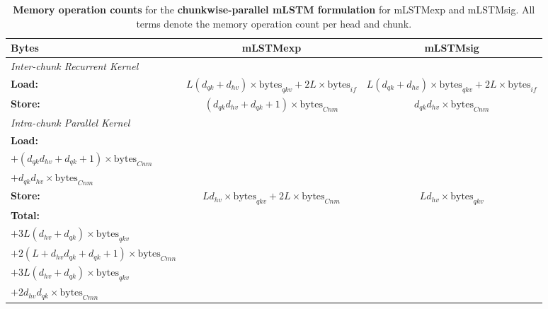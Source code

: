 \documentclass{article}
\begin{document}
    \begin{table}[htbp]
        \vspace{-0.3cm}
        \centering
        \caption{\label{tab:memop_counts_mlstm_chunkwise} \textbf{Memory operation counts} for the \textbf{chunkwise-parallel mLSTM formulation} for mLSTMexp and mLSTMsig.
            All terms denote the memory operation count per head and chunk.}
        \vspace{0.2cm}
        \begin{tabular}{lcc}
            \toprule
            Bytes           & mLSTMexp                                                                              & mLSTMsig                                                                      \\
            \midrule
            \multicolumn{3}{l}{\textit{Inter-chunk Recurrent Kernel}}                                                                                                                               \\
            \textbf{Load:}  & $L (d_{qk} + d_{hv}) \times \text{bytes}_{qkv} + 2L \times \text{bytes}_{if}$         & $L (d_{qk} + d_{hv}) \times \text{bytes}_{qkv} + 2L \times \text{bytes}_{if}$ \\
            \textbf{Store:} & $(d_{qk} d_{hv} + d_{qk} + 1) \times \text{bytes}_{Cnm}$                              & $d_{qk} d_{hv} \times \text{bytes}_{Cnm}$                                     \\
            \midrule
            \multicolumn{3}{l}{\textit{Intra-chunk Parallel Kernel}}                                                                                                                                \\
            \textbf{Load:}  & \thead{$L (2d_{qk} + d_{hv}) \times \text{bytes}_{qkv} + 2L \times \text{bytes}_{if}$                                                                                 \\ $ + (d_{qk} d_{hv} + d_{qk} + 1) \times \text{bytes}_{Cnm}$} & \thead{$L (2d_{qk} + d_{hv}) \times \text{bytes}_{qkv} + 2L \times \text{bytes}_{if}$ \\ $+ d_{qk} d_{hv} \times \text{bytes}_{Cnm}$} \\
            \textbf{Store:} & $L d_{hv} \times \text{bytes}_{qkv} + 2 L \times \text{bytes}_{Cnm}$                  & $L d_{hv} \times \text{bytes}_{qkv}$                                          \\
            \midrule[0.75pt]
            \textbf{Total:} & \thead{$4 L \times \text{bytes}_{if}$                                                                                                                                 \\ $ + 3 L \left(d_{hv} + d_{qk}\right) \times \text{bytes}_{qkv} $ \\ $ + 2  \left(L + d_{hv} d_{qk} + d_{qk} + 1\right) \times \text{bytes}_{Cmn}$} & \thead{$4 L \times \text{bytes}_{if}$ \\ $ + 3 L \left(d_{hv} + d_{qk}\right) \times \text{bytes}_{qkv} $ \\ $ + 2 d_{hv} d_{qk} \times \text{bytes}_{Cmn}$} \\

\end{tabular}
\end{table}
\end{document}
